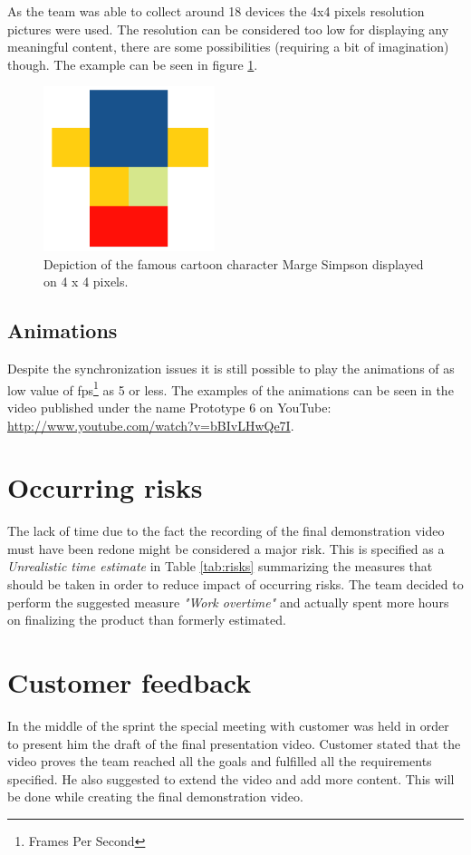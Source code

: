 As the team was able to collect around 18 devices the 4x4 pixels resolution pictures were used. The resolution can be considered too low for displaying any meaningful content, there are some possibilities (requiring a bit of imagination) though. The example can be seen in figure \ref{fig:sprint6_marge}.

\begin{figure}[H]
	\centering
		\includegraphics[width=5cm]{./sprint6/marge.png}
	\caption{Depiction of the famous cartoon character Marge Simpson displayed on 4 x 4 pixels.}
	\label{fig:sprint6_marge}
\end{figure}

\subsection{Animations}
Despite the synchronization issues it is still possible to play the animations of as low value of fps\footnote{Frames Per Second} as 5 or less. The examples of the animations can be seen in the video published under the name Prototype 6 on YouTube: \url{http://www.youtube.com/watch?v=bBIvLHwQe7I}.

\section{Occurring risks}
The lack of time due to the fact the recording of the final demonstration video must have been redone might be considered a major risk. This is specified as a \textit{Unrealistic time estimate} in Table \ref{tab:risks} summarizing the measures that should be taken in order to reduce impact of occurring risks. The team decided to perform the suggested measure \textit{"Work overtime"} and actually spent more hours on finalizing the product than formerly estimated.

\section{Customer feedback}
In the middle of the sprint the special meeting with customer was held in order to present him the draft of the final presentation video. Customer stated that the video proves the team reached all the goals and fulfilled all the requirements specified. He also suggested to extend the video and add more content. This will be done while creating the final demonstration video.

